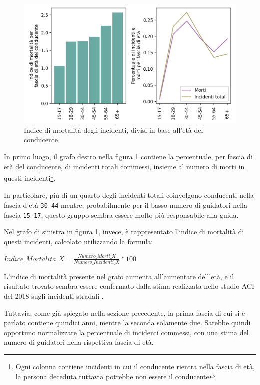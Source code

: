 \documentclass[a4paper,12pt]{report}
\newcommand{\columnstyle}[1]{\texttt{#1}}
\begin{document}
\begin{figure}
    \includegraphics[width=\linewidth]{../src/incidenti/incidenti_senza_coords/mortalita/indice_mortalita_eta.png}
    \caption{Indice di mortalità degli incidenti, divisi in base all'età del conducente}
    \label{fig:indice-mortalita-eta}
\end{figure}

In primo luogo, il grafo destro nella figura \ref{fig:indice-mortalita-eta} contiene 
la percentuale, per fascia di età del conducente, di incidenti totali commessi, insieme 
al numero di morti in questi incidenti\footnote{Ogni colonna contiene incidenti in 
cui il conducente rientra nella fascia di età, la persona deceduta tuttavia potrebbe non 
essere il conducente}.

In particolare, più di un quarto degli incidenti totali coinvolgono conducenti nella 
fascia d'età \columnstyle{30-44} mentre, probabilmente per il basso numero di 
guidatori nella fascia \columnstyle{15-17}, questo gruppo sembra essere molto 
più responsabile alla guida.

Nel grafo di sinistra in figura \ref{fig:indice-mortalita-eta}, invece, 
è rappresentato l'indice di mortalità di questi incidenti, 
calcolato utilizzando la formula: 

\begin{center}
    $Indice\_Mortalita\_X = \displaystyle \frac{Numero\_Morti\_X}{Numero\_Incidenti\_X} * 100$ 
\end{center}

L'indice di mortalità presente nel grafo aumenta all'aumentare dell'età, 
e il risultato trovato sembra essere confermato dalla stima realizzata nello studio 
ACI del 2018 sugli incidenti stradali \cite{ACI:3}. 

Tuttavia, come già spiegato nella sezione precedente, la prima fascia di cui si è parlato 
contiene quindici anni, mentre la seconda solamente due. Sarebbe quindi opportuno 
normalizzare la percentuale di incidenti commessi, con una stima del numero di 
guidatori nella rispettiva fascia di età.
\end{document}
